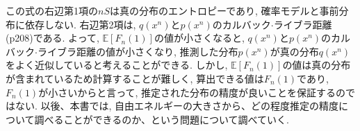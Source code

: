 \documentclass[11pt,a4paper]{jsarticle}
\begin{document}
この式の右辺第1項の$nS$は真の分布のエントロピーであり, 確率モデルと事前分布に依存しない. 右辺第2項は, $q(x^n)$と$p(x^n)$のカルバック$\cdot$ライブラ距離(p208)である. よって, $\mathbb{E}[F_{n}(1)]$の値が小さくなると, $q(x^n)$と$p(x^n)$のカルバック$\cdot$ライブラ距離の値が小さくなり, 推測した分布$p(x^n)$が真の分布$q(x^n)$をよく近似していると考えることができる. しかし, $\mathbb{E}[F_{n}(1)]$の値は真の分布が含まれているため計算することが難しく, 算出できる値は$F_n(1)$であり, $F_n(1)$が小さいからと言って, 推定された分布の精度が良いことを保証するのではない. 以後、本書では, 自由エネルギーの大きさから、どの程度推定の精度について調べることができるのか、という問題について調べていく.
\end{document}
